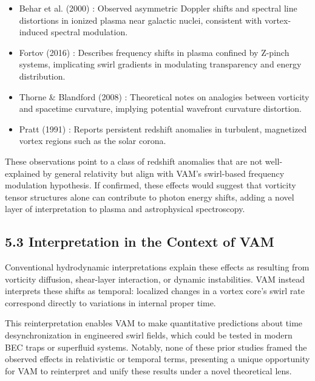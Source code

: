 \begin{itemize}

\item Behar et al. (2000) \cite{behar2000}: Observed asymmetric Doppler shifts and spectral line distortions in ionized plasma near galactic
nuclei, consistent with vortex-induced spectral modulation.

\item Fortov (2016) \cite{fortov2016}: Describes frequency shifts in plasma confined by Z-pinch systems, implicating swirl gradients in modulating
transparency and energy distribution.

\item Thorne & Blandford (2008) \cite{thorne2008}: Theoretical notes on analogies between vorticity and spacetime curvature, implying potential
wavefront curvature distortion.



\item Pratt (1991) \cite{pratt1991}: Reports persistent redshift anomalies in turbulent, magnetized vortex regions such as the solar corona.




\end{itemize}

These observations point to a class of redshift anomalies that are not well-explained by general relativity but align with VAM's swirl-based frequency modulation hypothesis. If confirmed, these effects would suggest that vorticity tensor structures alone can contribute to photon energy shifts, adding a novel layer of interpretation to plasma and astrophysical spectroscopy.


\subsection*{5.3 Interpretation in the Context of VAM}

Conventional hydrodynamic interpretations explain these effects as resulting from vorticity diffusion, shear-layer interaction, or dynamic instabilities. VAM instead interprets these shifts as temporal: localized changes in a vortex core's swirl rate correspond directly to variations in internal proper time.


This reinterpretation enables VAM to make quantitative predictions about time desynchronization in engineered swirl fields, which could be tested in modern BEC traps or superfluid systems. Notably, none of these prior studies framed the observed effects in relativistic or temporal terms, presenting a unique opportunity for VAM to reinterpret and unify these results under a novel theoretical lens.



